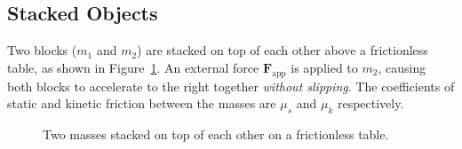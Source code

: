 \subsection{Stacked Objects}
Two blocks ($m_1$ and $m_2$) are stacked on top of each other above a
frictionless table, as shown in Figure~\ref{fig:stacked}. An external force
$\bm F_\text{app}$ is applied to $m_2$, causing both blocks to accelerate to the
right together \emph{without slipping}. The coefficients of static and kinetic
friction between the masses are $\mu_s$ and $\mu_k$ respectively.
\begin{figure}[ht]
  \centering
  \caption{Two masses stacked on top of each other on a frictionless table.}
  \label{fig:stacked}
\end{figure}

